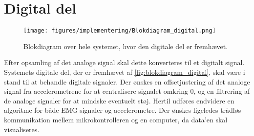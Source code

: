 \section{Digital del} \label{sec:digital_del_krav}
\begin{figure}[H]
\centering
\texttt{[image: figures/implementering/Blokdiagram\_digital.png]}
\caption{Blokdiagram over hele systemet, hvor den digitale del er fremhævet.}
\label{fig:blokdiagram_digital}
\end{figure}

\noindent
Efter opsamling af det analoge signal skal dette konverteres til et digitalt signal. 
Systemets digitale del, der er fremhævet af \autoref{fig:blokdiagram_digital}, skal være i stand til at behandle digitale signaler. 
Der ønskes en offsetjustering af det analoge signal fra accelerometrene for at centralisere signalet omkring 0, og en filtrering af de analoge signaler for at mindske eventuelt støj. 
Hertil udføres endvidere en algoritme for både EMG-signaler og accelerometre. 
Der ønskes ligeledes trådløs kommunikation mellem mikrokontrolleren og en computer, da data'en skal visualiseres.
